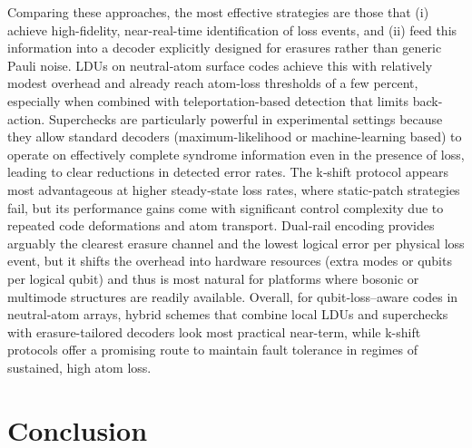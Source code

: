 \documentclass{article}
\begin{document}
Comparing these approaches, the most effective strategies are those that (i) achieve high-fidelity, near-real-time identification of loss events, and (ii) feed this information into a decoder explicitly designed for erasures rather than generic Pauli noise. 
LDUs on neutral‑atom surface codes achieve this with relatively modest overhead and already reach atom-loss thresholds of a few percent, especially when combined with teleportation-based detection that limits back-action. 
Superchecks are particularly powerful in experimental settings because they allow standard decoders (maximum-likelihood or machine-learning based) to operate on effectively complete syndrome information even in the presence of loss, leading to clear reductions in detected error rates. 
The k‑shift protocol appears most advantageous at higher steady‑state loss rates, where static-patch strategies fail, but its performance gains come with significant control complexity due to repeated code deformations and atom transport. 
Dual‑rail encoding provides arguably the clearest erasure channel and the lowest logical error per physical loss event, but it shifts the overhead into hardware resources (extra modes or qubits per logical qubit) and thus is most natural for platforms where bosonic or multimode structures are readily available. 
Overall, for qubit‑loss–aware codes in neutral‑atom arrays, hybrid schemes that combine local LDUs and superchecks with erasure-tailored decoders look most practical near-term, while k-shift protocols offer a promising route to maintain fault tolerance in regimes of sustained, high atom loss.\\

\section{Conclusion}
\end{document}

